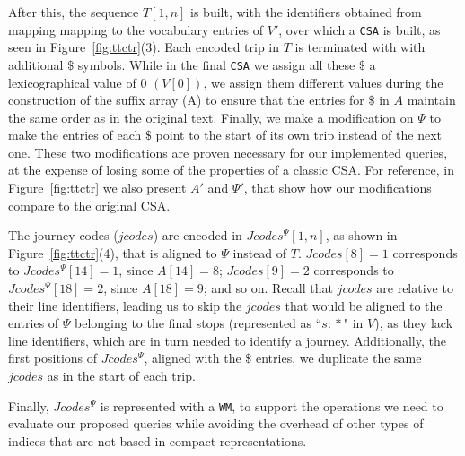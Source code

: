     After this, the sequence $T[1,n]$ is built, with the identifiers obtained from mapping mapping to the vocabulary entries of $V'$, over which a \texttt{CSA} is built, as seen in Figure~\ref{fig:ttctr}(3). Each encoded trip in $T$ is terminated with with additional $\$$ symbols. While in the final \texttt{CSA} we assign all these $\$$ a lexicographical value of 0 $(V[0])$, we assign them different values during the construction of the suffix array (A) to ensure that the entries for $\$$ in $A$ maintain the same order as in the original text. Finally, we make a modification on $\Psi$ to make the entries of each $\$$ point to the start of its own trip instead of the next one. These two modifications are proven necessary for our implemented queries, at the expense of losing some of the properties of a classic CSA. For reference, in Figure~\ref{fig:ttctr} we also present $A'$ and $\Psi'$, that show how our modifications compare to the original CSA.

    The journey codes ($jcodes$) are encoded in $Jcodes^{\Psi}[1,n]$, as shown in Figure~\ref{fig:ttctr}(4), that is aligned to $\Psi$ instead of $T$. $Jcodes[8]= 1$ corresponds to $Jcodes^{\Psi}[14]=1$, since $A[14]=8$; $Jcodes[9]= 2$ corresponds to $Jcodes^{\Psi}[18]=2$, since $A[18]=9$; and so on. Recall that $jcodes$ are relative to their line identifiers, leading us to skip the $jcodes$ that would be aligned to the entries of $\Psi$ belonging to the final stops (represented as ``$s\!:\!*$" in $V$), as they lack line identifiers, which are in turn needed to identify a journey. Additionally, the first positions of $Jcodes^{\Psi}$, aligned with the $\$$ entries, we duplicate the same $jcodes$ as in the start of each trip.
	
    Finally, $Jcodes^{\Psi}$ is represented with a \texttt{WM}, to support the operations we need to evaluate our proposed queries while avoiding the overhead of other types of indices that are not based in compact representations.
    
